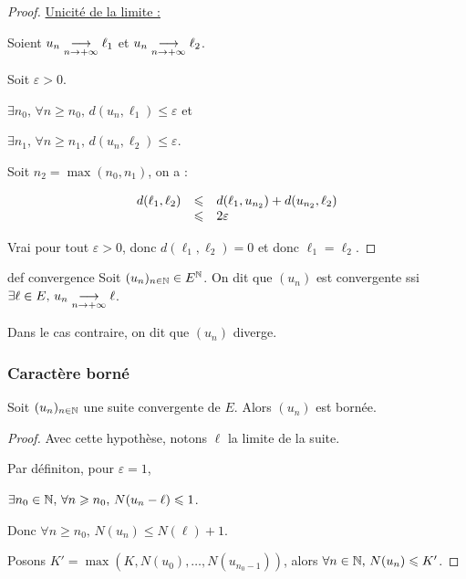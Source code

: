 \begin{proof} \space

    \qquad \uline{Unicité de la limite :}

    \avspace Soient $u_n \underset{n \to +\infty}{\longrightarrow} \ell_1$ et $u_n \underset{n \to +\infty}{\longrightarrow} \ell_2$.

    Soit $\varepsilon > 0$. 

    $\exists n_0, \, \forall n \geqslant n_0, \, d(u_n, \ell_1) \leqslant \varepsilon$ et

    $\exists n_1, \, \forall n \geqslant n_1, \, d(u_n, \ell_2) \leqslant \varepsilon$.

    Soit $n_2 = \max(n_0, n_1)$, on a :

    $$\begin{array}{rcl}
        d(\ell_1, \ell_2) & \leqslant & d(\ell_1, u_{n_2}) + d(u_{n_2}, \ell_2) \\
        \space & \leqslant & 2\varepsilon \\
    \end{array}$$

    Vrai pour tout $\varepsilon > 0$, donc $d(\ell_1, \ell_2) = 0$ et donc $\ell_1 = \ell_2$.
\end{proof}

\begin{definitionnt}{def convergence}{}
    Soit $(u_n)_{n \in \mathbb{N}} \in E^{\mathbb{N}}$. On dit que $(u_n)$ est convergente ssi 
    $\exists \ell \in E, \, u_n \underset{n \to +\infty}{\longrightarrow} \ell$.

    Dans le cas contraire, on dit que $(u_n)$ diverge.
\end{definitionnt}

\subsubsection{Caractère borné}

\begin{definitionnt}{}{}
    Soit $(u_n)_{n \in \mathbb{N}}$ une suite convergente de $E$. Alors $(u_n)$ est bornée.
\end{definitionnt}


\begin{proof}
    Avec cette hypothèse, notons $\ell$ la limite de la suite. 

    Par définiton, pour $\varepsilon = 1$,
    
    $\exists n_0 \in \mathbb{N}, \, \forall n \geqslant n_0, \, N(u_n - \ell) \leqslant 1$.

    Donc $\forall n \geqslant n_0, \, N(u_n) \leqslant N(\ell) + 1$.

    Posons $K' = \max(K, N(u_0), \ldots, N(u_{n_0 - 1}))$, alors $\forall n \in \mathbb{N}, \, N(u_n) \leqslant K'$.
\end{proof}

